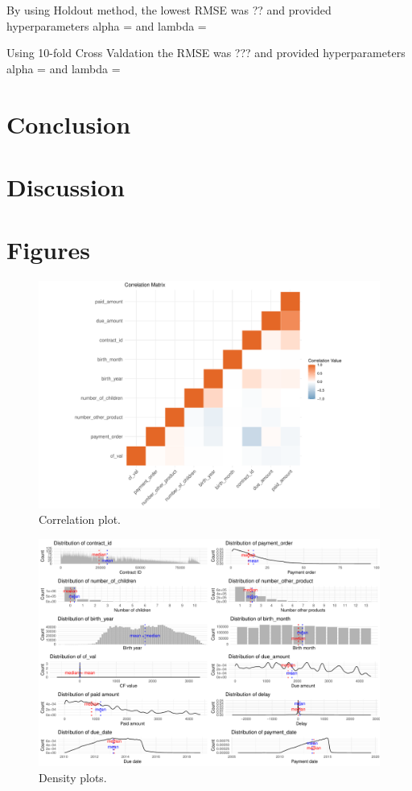 \documentclass[
]{article}
\begin{document}
By using Holdout method, the lowest RMSE was ?? and provided hyperparameters alpha = and lambda =

Using 10-fold Cross Valdation the RMSE was ??? and provided hyperparameters alpha = and lambda =

\hypertarget{conclusion}{%
\section{Conclusion}\label{conclusion}}

\hypertarget{discussion}{%
\section{Discussion}\label{discussion}}

\hypertarget{figures}{%
\section{Figures}\label{figures}}

\begin{figure}
\centering
\includegraphics{Documentation_Rmarkdown_files/figure-latex/correlogram-1.pdf}
\caption{\label{fig:correlogram}\label{fig:correlogram}Correlation plot.}
\end{figure}

\begin{figure}
\centering
\includegraphics{Documentation_Rmarkdown_files/figure-latex/density-1.pdf}
\caption{\label{fig:density}\label{fig:density}Density plots.}
\end{figure}
\end{document}
